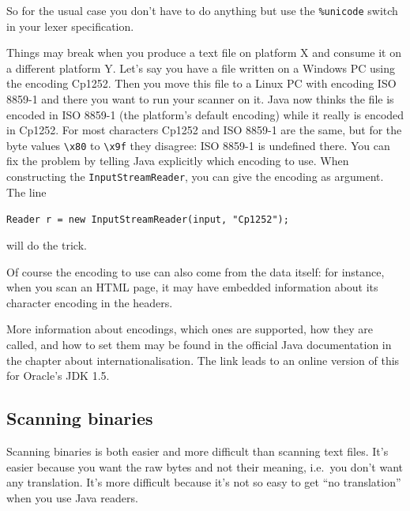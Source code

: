 \documentclass[11pt]{scrartcl}
\begin{document}
So for the usual case you don't have to do anything but use the
\texttt{\%unicode} switch in your lexer specification.

Things may break when you produce a text file on platform X and
consume it on a different platform Y. Let's say you have a file
written on a Windows PC using the encoding Cp1252. Then you move
this file to a Linux PC with encoding ISO 8859-1 and there you want
to run your scanner on it. Java now thinks the file is encoded
in ISO 8859-1 (the platform's default encoding) while it really is 
encoded in Cp1252. For most characters
Cp1252 and ISO 8859-1 are the same, but for the byte values \verb+\x80+
to \verb+\x9f+ they disagree: ISO 8859-1 is undefined there. You can fix
the problem by telling Java explicitly which encoding to use. When
constructing the \texttt{InputStreamReader}, you can give the encoding
as argument. The line
\begin{center}
\texttt{Reader r = new InputStreamReader(input, "Cp1252"); }
\end{center}
will do the trick.

Of course the encoding to use can also come from the data itself:
for instance, when you scan an HTML page, it may have embedded 
information about its character encoding in the headers.

More information about encodings, which ones are supported, how
they are called, and how to set them may be found in the
official Java documentation in the chapter about 
internationalisation. 
The link 
leads to an online version of this for Oracle's JDK 1.5.

\subsection{Scanning binaries\label{sec:howtobinary}}

Scanning binaries is both easier and more difficult
than scanning text files. It's easier because you want
the raw bytes and not their meaning, i.e.~you don't want 
any translation.
It's more difficult because it's not so easy to get
``no translation'' when you use Java readers. 
\end{document}
